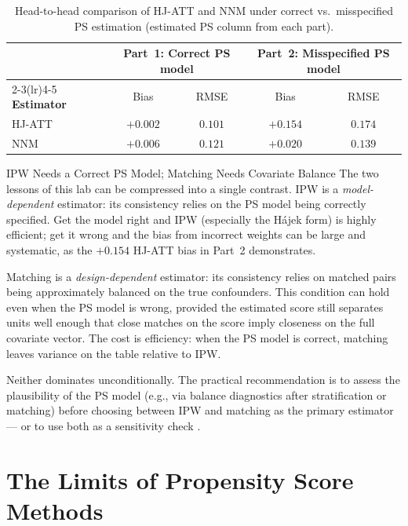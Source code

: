 \documentclass[master.tex]{subfiles}
\begin{document}
\begin{table}[h]
\centering
\renewcommand{\arraystretch}{1.4}
\caption{Head-to-head comparison of HJ-ATT and NNM under correct
  vs.\ misspecified PS estimation (estimated PS column from each part).}
\label{w6:tab:comparison}
\begin{tabular}{lcccc}
\toprule
& \multicolumn{2}{c}{\textbf{Part~1: Correct PS model}}
& \multicolumn{2}{c}{\textbf{Part~2: Misspecified PS model}} \\
\cmidrule(lr){2-3}\cmidrule(lr){4-5}
\textbf{Estimator} & Bias & RMSE & Bias & RMSE \\
\midrule
HJ-ATT & $+0.002$ & $0.101$ & $+0.154$ & $0.174$ \\
NNM    & $+0.006$ & $0.121$ & $+0.020$ & $0.139$ \\
\bottomrule
\end{tabular}
\end{table}

\begin{warn}{IPW Needs a Correct PS Model; Matching Needs Covariate Balance}
The two lessons of this lab can be compressed into a single
contrast.  IPW is a \emph{model-dependent} estimator: its consistency
relies on the PS model being correctly specified.  Get the model right
and IPW (especially the Hájek form) is highly efficient; get it wrong
and the bias from incorrect weights can be large and systematic,
as the $+0.154$ HJ-ATT bias in Part~2 demonstrates.

Matching is a \emph{design-dependent} estimator: its consistency relies
on matched pairs being approximately balanced on the true confounders.
This condition can hold even when the PS model is wrong, provided the
estimated score still separates units well enough that close matches on
the score imply closeness on the full covariate vector.  The cost is
efficiency: when the PS model is correct, matching leaves variance on
the table relative to IPW.

Neither dominates unconditionally.  The practical recommendation is to
assess the plausibility of the PS model (e.g., via balance diagnostics
after stratification or matching) before choosing between IPW and
matching as the primary estimator --- or to use both as a sensitivity
check \citep{yang2016multilevel, yang2023multiply}.
\end{warn}

\section{The Limits of Propensity Score Methods}
\end{document}
